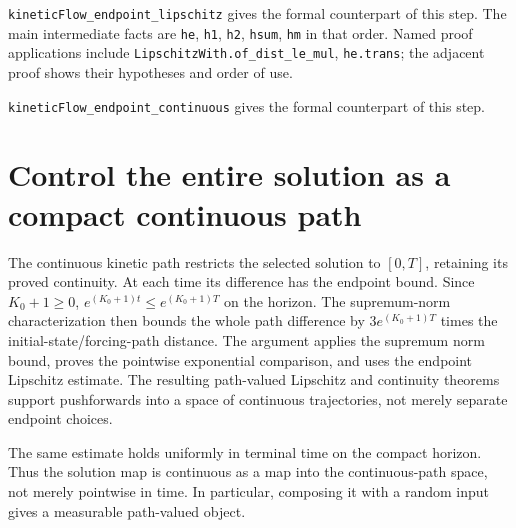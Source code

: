 \documentclass[11pt,a4paper]{article}
\begin{document}
\begin{leanbox}
\texttt{kinetic\allowbreak{}Flow\_\allowbreak{}endpoint\_\allowbreak{}lipschitz} gives the formal counterpart of this step. The main intermediate facts are \texttt{he}, \texttt{h1}, \texttt{h2}, \texttt{hsum}, \texttt{hm} in that order. Named proof applications include \texttt{Lipschitz\allowbreak{}With.\allowbreak{}of\_\allowbreak{}dist\_\allowbreak{}le\_\allowbreak{}mul}, \texttt{he.\allowbreak{}trans}; the adjacent proof shows their hypotheses and order of use.




\texttt{kinetic\allowbreak{}Flow\_\allowbreak{}endpoint\_\allowbreak{}continuous} gives the formal counterpart of this step.
\end{leanbox}

\section{\texorpdfstring{Control the entire solution as a compact continuous path}{Control the entire solution as a compact continuous path}}


The continuous kinetic path restricts the selected solution to \([0,T]\), retaining its proved continuity. At each time its difference has the endpoint bound. Since \(K_0+1\ge0\), \(e^{(K_0+1)t}\le e^{(K_0+1)T}\) on the horizon. The supremum-norm characterization then bounds the whole path difference by \(3e^{(K_0+1)T}\) times the initial-state/\allowbreak{}forcing-path distance. The argument applies the supremum norm bound, proves the pointwise exponential comparison, and uses the endpoint Lipschitz estimate. The resulting path-valued Lipschitz and continuity theorems support pushforwards into a space of continuous trajectories, not merely separate endpoint choices.



The same estimate holds uniformly in terminal time on the compact horizon. Thus the solution map is continuous as a map into the continuous-path space, not merely pointwise in time. In particular, composing it with a random input gives a measurable path-valued object.
\end{document}
